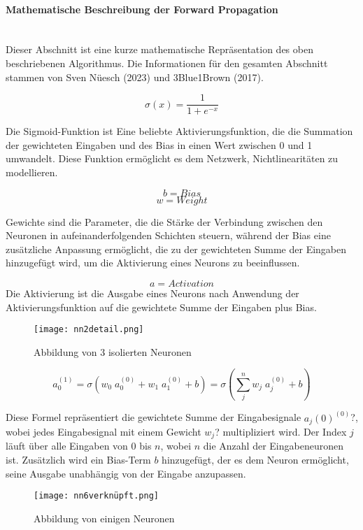 \paragraph{Mathematische Beschreibung der Forward Propagation}
\label{sec:forward_propagation_math}
\mbox{}\\\noindent Dieser Abschnitt ist eine kurze mathematische Repräsentation des oben beschriebenen Algorithmus. Die Informationen für den gesamten Abschnitt stammen von Sven Nüesch (2023) und 3Blue1Brown (2017).

\[\sigma(x)=\frac{1}{1+e^{-x}}\]

\noindent Die Sigmoid-Funktion ist Eine beliebte Aktivierungsfunktion, die die Summation der gewichteten Eingaben und des Bias in einen Wert zwischen 0 und 1 umwandelt. Diese Funktion ermöglicht es dem Netzwerk, Nichtlinearitäten zu modellieren.

\[b=Bias\]
\[w=Weight\]

\noindent Gewichte sind die Parameter, die die Stärke der Verbindung zwischen den Neuronen in aufeinanderfolgenden Schichten steuern, während der Bias eine zusätzliche Anpassung ermöglicht, die zu der gewichteten Summe der Eingaben hinzugefügt wird, um die Aktivierung eines Neurons zu beeinflussen.

\[a=Activation\]
Die Aktivierung ist die Ausgabe eines Neurons nach Anwendung der Aktivierungsfunktion auf die gewichtete Summe der Eingaben plus Bias.

\begin{figure}[H]
	\centering
		\texttt{[image: nn2detail.png]}
	\label{fig:nn2detail}
	\caption{Abbildung von 3 isolierten Neuronen}
\end{figure}

\[a_{0}^{(1)} = \sigma(w_{0}\; a_{0}^{(0)} + w_{1}\; a_{1}^{(0)} + b) = \sigma(\sum_{j}^{n} w_{j}\;a_{j} ^{(0)} + b)\]

\noindent Diese Formel repräsentiert die gewichtete Summe der Eingabesignale $a_j(0)^(0)$?, wobei jedes Eingabesignal mit einem Gewicht $w_j$? multipliziert wird. Der Index $j$ läuft über alle Eingaben von 0 bis $n$, wobei $n$ die Anzahl der Eingabeneuronen ist. Zusätzlich wird ein Bias-Term $b$ hinzugefügt, der es dem Neuron ermöglicht, seine Ausgabe unabhängig von der Eingabe anzupassen.

\begin{figure}[H]
	\centering
		\texttt{[image: nn6verknüpft.png]}
	\label{fig:nn6verknüpft}
	\caption{Abbildung von einigen Neuronen}
\end{figure}


